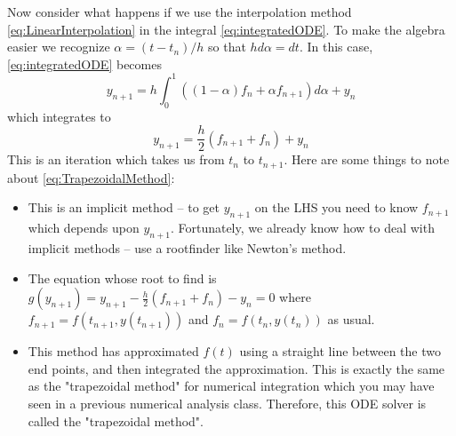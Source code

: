 \documentclass[hidelinks,notitlepage]{book}
\begin{document}
Now consider what happens if we use the interpolation method \cref{eq:LinearInterpolation} in the integral \cref{eq:integratedODE}.  To make the algebra easier we recognize $\alpha = (t - t_n)/h$ so that $h d\alpha = dt$.  In this case, \cref{eq:integratedODE} becomes
\begin{equation}
\label{eq:IntegrateLinearInterp}
y_{n+1} = h \int_{0}^{1} \left( (1-\alpha) f_n + \alpha f_{n+1} \right) d \alpha + y_n
\end{equation}
which integrates to
\begin{equation}
\label{eq:TrapezoidalMethod}
y_{n+1} = \frac{h}{2} \left( f_{n+1} + f_n \right) + y_n
\end{equation}
This is an iteration which takes us from $t_n$ to $t_{n+1}$.  
Here are some things to note about \cref{eq:TrapezoidalMethod}:
\begin{itemize}
	\item This is an implicit method -- to get $y_{n+1}$ on the LHS you need to know $f_{n+1}$ which depends upon $y_{n+1}$.  Fortunately, we already know how to deal with implicit methods -- use a rootfinder like Newton's method.
	\item The equation whose root to find is $g(y_{n+1}) = y_{n+1} -\frac{h}{2} \left( f_{n+1} + f_n \right) - y_n = 0$ where $f_{n+1} = f(t_{n+1}, y(t_{n+1}))$ and $f_{n} = f(t_{n}, y(t_{n}))$ as usual.
	\item This method has approximated $f(t)$ using a straight line between the two end points, and then integrated the approximation.  This is exactly the same as the "trapezoidal method" for numerical integration which you may have seen in a previous numerical analysis class.  Therefore, this ODE solver is called the "trapezoidal method".
\end{itemize}
\end{document}
